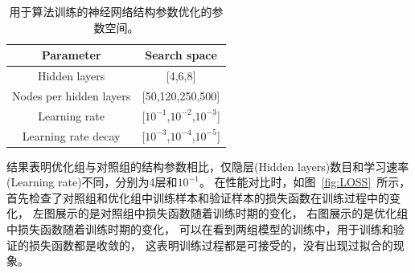 \begin{table}[ht]
\caption{用于算法训练的神经网络结构参数优化的参数空间。}
\begin{center}
\begin{tabular}{c|c}
    \hline
    \hline
    Parameter & Search space  \\
    \hline  
    Hidden layers & [4,6,8] \\
    \hline  
    Nodes per hidden layers & [50,120,250,500] \\
    \hline  
    Learning rate & [$10^{-1}$,$10^{-2}$,$10^{-3}$]\\
    \hline  
    Learning rate decay & [$10^{-3}$,$10^{-4}$,$10^{-5}$] \\
    \hline
    \hline
\end{tabular}
\end{center}
\label{tab:Space}
\end{table}

结果表明优化组与对照组的结构参数相比，仅隐层(Hidden layers)数目和学习速率(Learning rate)不同，分别为4层和$10^{-1}$。
在性能对比时，如图~\ref{fig:LOSS}~所示，
首先检查了对照组和优化组中训练样本和验证样本的损失函数在训练过程中的变化，
左图展示的是对照组中损失函数随着训练时期的变化，
右图展示的是优化组中损失函数随着训练时期的变化，
可以在看到两组模型的训练中，用于训练和验证的损失函数都是收敛的，
这表明训练过程都是可接受的，没有出现过拟合的现象。


